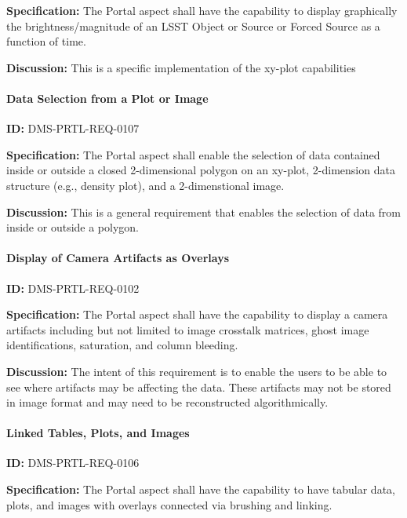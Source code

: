\documentclass[SE,toc,lsstdraft]{lsstdoc}
\begin{document}
\textbf{Specification:}
The Portal aspect shall have the capability to display graphically the brightness/magnitude of an LSST Object or Source or Forced Source as a function of time.

\textbf{Discussion:}
This is a specific implementation of the xy-plot capabilities

\paragraph{Data Selection from a Plot or Image}\hfill  %

\label{DMS-PRTL-REQ-0107}
\textbf{ID:} DMS-PRTL-REQ-0107

\textbf{Specification:}
The Portal aspect shall enable the selection of data contained inside or outside a closed 2-dimensional polygon on an xy-plot, 2-dimension data structure (e.g., density plot), and a 2-dimenstional image.

\textbf{Discussion:}
This is a general requirement that enables the selection of data from inside or outside a polygon.

\paragraph{Display of Camera Artifacts as Overlays}\hfill  %

\label{DMS-PRTL-REQ-0102}
\textbf{ID:} DMS-PRTL-REQ-0102

\textbf{Specification:}
The Portal aspect shall have the capability to display a camera artifacts including but not limited to image crosstalk matrices, ghost image identifications, saturation, and column bleeding.

\textbf{Discussion:}
The intent of this requirement is to enable the users to be able to see where artifacts may be affecting the data. These artifacts may not be stored in image format and may need to be reconstructed algorithmically.

\paragraph{Linked Tables, Plots, and Images}\hfill  %

\label{DMS-PRTL-REQ-0106}
\textbf{ID:} DMS-PRTL-REQ-0106

\textbf{Specification:}
The Portal aspect shall have the capability to have tabular data, plots, and images with overlays connected via brushing and linking.
\end{document}

